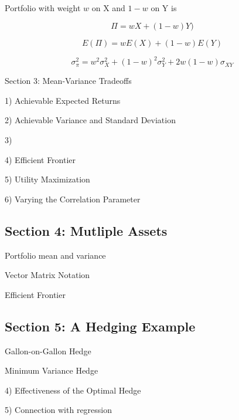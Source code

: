 Portfolio with weight $w$ on X and $1-w$ on Y is

\[\Pi = wX+(1-w)Y)\]


\[ E(\Pi) = wE(X) + (1-w)E(Y) \]

\[ \sigma^2_{\pi} =  w^2 \sigma^2_X + (1-w)^2\sigma^2_Y + 2w(1-w)\sigma_{XY} \]

Section 3: Mean-Variance Tradeoffs 


1) Achievable Expected Returns

2) Achievable Variance and Standard Deviation

3)

4) Efficient Frontier

5) Utility Maximization

6) Varying the Correlation Parameter



\subsection*{Section 4: Mutliple Assets}


Portfolio mean and variance

Vector Matrix Notation

Efficient Frontier


\subsection*{Section 5: A Hedging Example}

Gallon-on-Gallon Hedge

Minimum Variance Hedge

4) Effectiveness of the Optimal Hedge

5) Connection with regression



